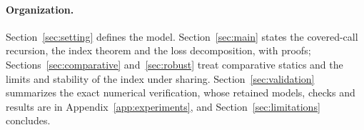 \paragraph{Organization.}
Section~\ref{sec:setting} defines the model. Section~\ref{sec:main} states the
covered-call recursion, the index theorem and the loss decomposition, with
proofs; Sections~\ref{sec:comparative} and~\ref{sec:robust} treat comparative
statics and the limits and stability of the index under sharing. Section~\ref{sec:validation} summarizes the
exact numerical verification, whose retained models, checks and results are in
Appendix~\ref{app:experiments}, and Section~\ref{sec:limitations} concludes.
